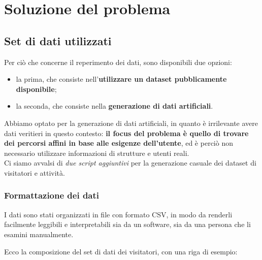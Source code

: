\documentclass{CSUniSchoolLabReport}
\begin{document}
\pagebreak{}
\section{Soluzione del problema}
\subsection{Set di dati utilizzati}

Per ciò che concerne il reperimento dei dati, sono disponibili due opzioni:

\begin{itemize}
    \item la prima, che consiste nell'\textbf{utilizzare un dataset pubblicamente disponibile};
    \item la seconda, che consiste nella \textbf{generazione di dati artificiali}.
\end{itemize}

Abbiamo optato per la generazione di dati artificiali, in quanto è irrilevante avere dati veritieri in questo contesto: \textbf{il focus del problema è quello di trovare dei percorsi affini in base alle esigenze dell'utente}, ed è perciò non necessario utilizzare informazioni di strutture e utenti reali. \\
Ci siamo avvalsi di \textit{due script aggiuntivi} per la generazione casuale dei dataset di visitatori e attività.

\subsubsection{Formattazione dei dati}

I dati sono stati organizzati in file con formato CSV, in modo da renderli facilmente leggibili e interpretabili sia da un software, sia da una persona che li esamini manualmente.

Ecco la composizione del set di dati dei visitatori, con una riga di esempio: \\
\end{document}
